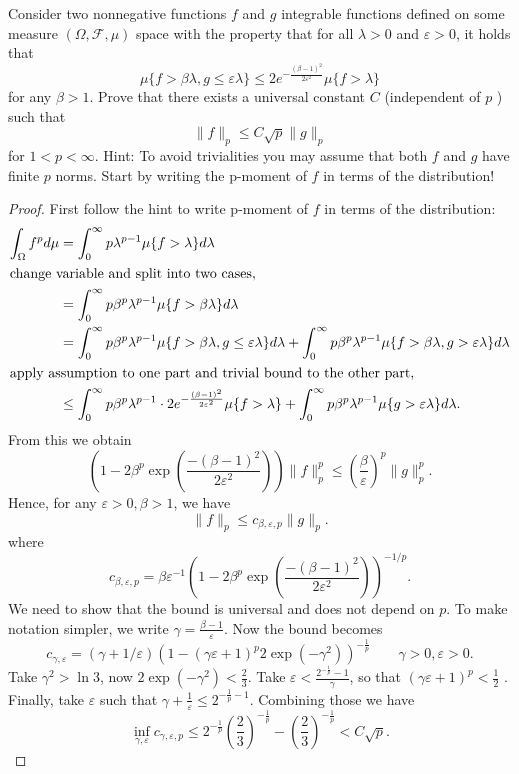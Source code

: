 
\begin{problem}
	Consider two nonnegative functions $f$ and $g$ integrable functions defined on some measure $(\Omega, \mathcal{F}, \mu)$ space with the property that for all $\lambda>0$ and $\varepsilon>0$, it holds that
\[
\mu\{f>\beta \lambda, g \leq \varepsilon \lambda\} \leq 2 e^{-\frac{(\beta-1)^2}{2 \varepsilon^2}} \mu\{f>\lambda\}
\]
for any $\beta>1$. Prove that there exists a universal constant $C$ (independent of $p$ ) such that
\[
\|f\|_p \leq C \sqrt{p}\|g\|_p
\]
for $1<p<\infty$.
Hint: To avoid trivialities you may assume that both $f$ and $g$ have finite $p$ norms. Start by writing the p-moment of $f$ in terms of the distribution!
\end{problem}
\begin{proof}
	First follow the hint to write p-moment of $f$ in terms of the distribution:
	 \begin{align*}
		\int _\Omega f^p d \mu
		&= \int _0^\infty p \lambda^{p - 1} \mu \{f > \lambda\}  d \lambda \\
		\intertext{change variable and split into two cases,}
		&= \int _0^\infty p \beta^p \lambda^{p - 1} \mu \{f > \beta \lambda\}  d \lambda \\
		&= \int _0^\infty p \beta^p \lambda^{p - 1} \mu \{f > \beta \lambda, g \le  \varepsilon \lambda\}  d \lambda 
		+ \int _0^\infty p \beta^p \lambda^{p - 1} \mu \{f > \beta \lambda, g >  \varepsilon \lambda\}  d \lambda \\
		\intertext{apply assumption to one part and trivial bound to the other part,}
		&\le  \int _0^\infty p \beta^p \lambda^{p-1} \cdot 2 e^{-\frac{(\beta-1)^2}{2 \varepsilon^2}} \mu\{f>\lambda\}
		+ \int _0^\infty p \beta^p \lambda^{p - 1} \mu \{g >  \varepsilon \lambda\}  d \lambda
	.\end{align*}
	From this we obtain
	\[
		\left( 1 - 2 \beta^p \exp\left( \frac{- (\beta - 1)^2}{2 \varepsilon^2} \right)  \right) 
		\|f\|_p^p
		\le  \left( \frac{\beta}{\varepsilon} \right) ^p \|g\|_p^p
	.\] 
	Hence, for any $\varepsilon>0, \beta>1$, we have 
	\[
		\|f\|_p \le c_{\beta, \varepsilon, p} \|g\|_p
	.\] 
	where
	\[
		c_{\beta, \varepsilon,p} =
		\beta \varepsilon^{-1}\left( 1 - 2 \beta^p \exp\left( \frac{- (\beta - 1)^2}{2 \varepsilon^2} \right)  \right) ^{-1 / p}
	.\] 
	We need to show that the bound is universal and does not depend on $p$. To make notation simpler, we write $\gamma = \frac{\beta - 1}{\varepsilon}$. Now the bound becomes
	\[
		c_{\gamma, \varepsilon} = \left( \gamma + 1 / \varepsilon \right) \left( 1 - \left( \gamma \varepsilon + 1 \right) ^p 2 \exp(- \gamma^2) \right) ^{- \frac{1}{p}}
		\qquad \gamma>0, \varepsilon>0
	.\] 
	Take $\gamma^2 > \ln 3$, now $2 \exp(- \gamma^2) < \frac{2}{3}$. Take $\varepsilon < \frac{2^{- \frac{1}{p}} - 1}{ \gamma}$, so that $\left( \gamma \varepsilon + 1 \right) ^p < \frac{1}{2}$ . Finally, take $\varepsilon$ such that $\gamma + \frac{1}{\varepsilon} \le  2^{- \frac{1}{p} - 1}$. Combining those we have
	\[
		\inf_{\gamma, \varepsilon} c_{\gamma, \varepsilon, p} \le 2^{- \frac{1}{p}} \left( \frac{2}{3} \right) ^{-\frac{1}{p}} - \left( \frac{2}{3} \right) ^{-\frac{1}{p}} < C \sqrt{p} 
	.\] 


\end{proof}
